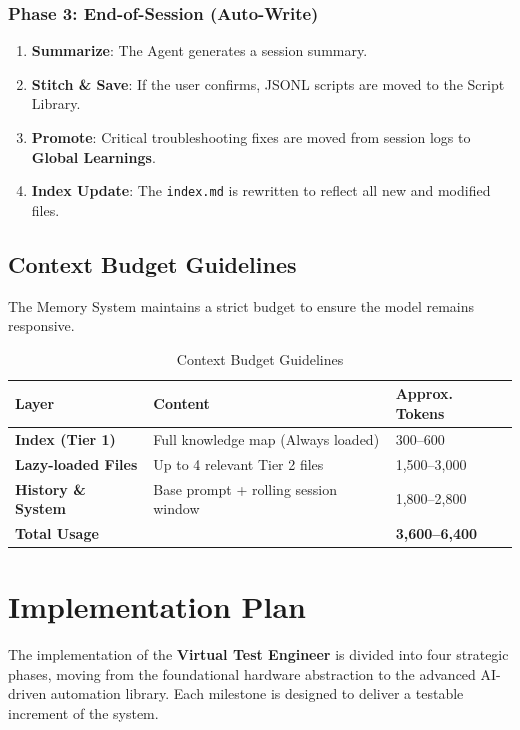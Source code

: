 \documentclass[conference]{IEEEtran}
\begin{document}
\subsubsection{Phase 3: End-of-Session (Auto-Write)}
\begin{enumerate}
    \item \textbf{Summarize}: The Agent generates a session summary.
    \item \textbf{Stitch \& Save}: If the user confirms, JSONL scripts are moved to the Script Library.
    \item \textbf{Promote}: Critical troubleshooting fixes are moved from session logs to \textbf{Global Learnings}.
    \item \textbf{Index Update}: The \texttt{index.md} is rewritten to reflect all new and modified files.
\end{enumerate}

\subsection{Context Budget Guidelines}
The Memory System maintains a strict budget to ensure the model remains responsive.

\begin{table}[htbp]
\caption{Context Budget Guidelines}
\begin{center}
\begin{tabular}{|p{2cm}|p{3.5cm}|p{2cm}|}
\hline
\textbf{Layer} & \textbf{Content} & \textbf{Approx. Tokens} \\
\hline
\textbf{Index (Tier 1)} & Full knowledge map (Always loaded) & 300--600 \\
\hline
\textbf{Lazy-loaded Files} & Up to 4 relevant Tier 2 files & 1,500--3,000 \\
\hline
\textbf{History \& System} & Base prompt + rolling session window & 1,800--2,800 \\
\hline
\textbf{Total Usage} & & \textbf{3,600--6,400} \\
\hline
\end{tabular}
\end{center}
\end{table}

\section{Implementation Plan}
The implementation of the \textbf{Virtual Test Engineer} is divided into four strategic phases, moving from the foundational hardware abstraction to the advanced AI-driven automation library. Each milestone is designed to deliver a testable increment of the system.
\end{document}
